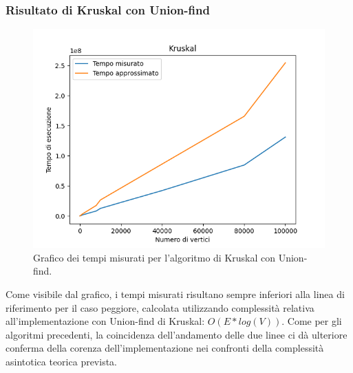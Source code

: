 \subsubsection{Risultato di Kruskal con Union-find}
\begin{figure}[H]
	\centering
	\includegraphics[width=1\linewidth]{"../graphs/Kruskal"}
	\caption{Grafico dei tempi misurati per l'algoritmo di Kruskal con Union-find.}
	\label{fig:kruskal-opt-graph}
\end{figure}
Come visibile dal grafico, i tempi misurati risultano sempre inferiori alla linea di riferimento per il caso peggiore, calcolata utilizzando complessità relativa all'implementazione con Union-find di Kruskal: $O(E*log(V))$. Come per gli algoritmi precedenti, la coincidenza dell'andamento delle due linee ci dà ulteriore conferma della corenza dell'implementazione nei confronti della complessità asintotica teorica prevista.

